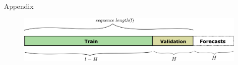 \documentclass{beamer}
\begin{document}
\begin{frame}{Appendix}
  	\begin{figure}
   \includegraphics[scale=0.40]{images/trainvalidation}
   \caption{}
  \end{figure} 
\end{frame}


%
\end{document}

